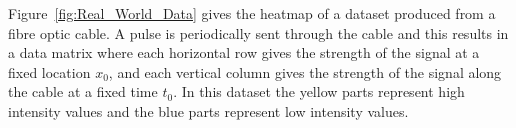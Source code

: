 \documentclass[a4paper,11pt]{article}
\begin{document}
Figure~\ref{fig:Real_World_Data} gives the heatmap of a dataset produced from a fibre optic cable. A pulse is periodically sent through the cable and this results in a data matrix where each horizontal row gives the strength of the signal at a fixed location $x_0$, and each vertical column gives the strength of the signal along the cable at a fixed time $t_0$. In this dataset the yellow parts represent high intensity values and the blue parts represent low intensity values.

\begin{figure}
	\subfloat[][]{
}
\end{figure}
\end{document}

